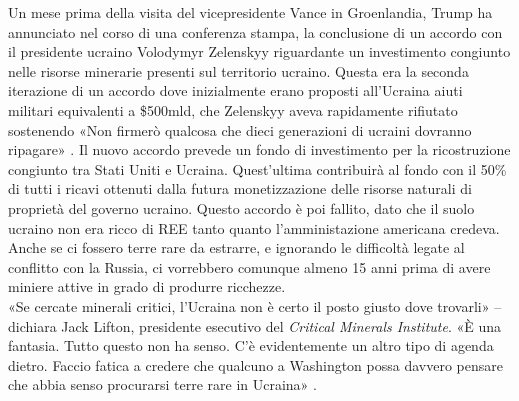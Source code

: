 \documentclass[12pt,a4paper,oneside]{book}
\begin{document}
Un mese prima della visita del vicepresidente Vance in Groenlandia, Trump ha annunciato nel corso di una conferenza stampa, la conclusione di un accordo con il presidente ucraino Volodymyr Zelenskyy riguardante un investimento congiunto nelle risorse minerarie presenti sul territorio ucraino. Questa era la seconda iterazione di un accordo dove inizialmente erano proposti all'Ucraina aiuti militari equivalenti a \$500mld, che Zelenskyy aveva rapidamente rifiutato sostenendo «Non firmerò qualcosa che dieci generazioni di ucraini dovranno ripagare» \cite{guardian2025trumpdeal}.
Il nuovo accordo prevede un fondo di investimento per la ricostruzione congiunto tra Stati Uniti e Ucraina. Quest'ultima contribuirà al fondo con il 50\% di tutti i ricavi ottenuti dalla futura monetizzazione delle risorse naturali di proprietà del governo ucraino.
Questo accordo è poi fallito, dato che il suolo ucraino non era ricco di REE tanto quanto l'amministazione americana credeva. Anche se ci fossero terre rare da estrarre, e ignorando le difficoltà legate al conflitto con la Russia, ci vorrebbero comunque almeno 15 anni prima di avere miniere attive in grado di produrre ricchezze.\\
«Se cercate minerali critici, l'Ucraina non è certo il posto giusto dove trovarli» – dichiara Jack Lifton, presidente esecutivo del \textit{Critical Minerals Institute}. «È una fantasia. Tutto questo non ha senso. C'è evidentemente un altro tipo di agenda dietro. Faccio fatica a credere che qualcuno a Washington possa davvero pensare che abbia senso procurarsi terre rare in Ucraina» \cite{ieee2023ukraine}.
\end{document}
